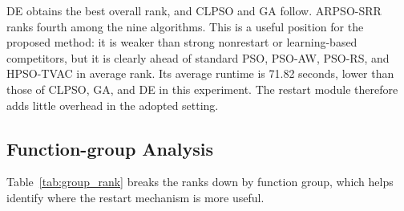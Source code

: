 \documentclass[conference]{IEEEtran}
\begin{document}
\begin{table}[!t]
    \caption{Average Rank and Runtime of Compared Algorithms}
    \centering
    \footnotesize
    \setlength{\tabcolsep}{2pt}
    \label{tab:rank_runtime}
\end{table}

DE obtains the best overall rank, and CLPSO and GA follow. ARPSO-SRR ranks fourth among the nine algorithms. This is a useful position for the proposed method: it is weaker than strong nonrestart or learning-based competitors, but it is clearly ahead of standard PSO, PSO-AW, PSO-RS, and HPSO-TVAC in average rank. Its average runtime is 71.82 seconds, lower than those of CLPSO, GA, and DE in this experiment. The restart module therefore adds little overhead in the adopted setting.

\subsection{Function-group Analysis}
Table~\ref{tab:group_rank} breaks the ranks down by function group, which helps identify where the restart mechanism is more useful.
\end{document}
